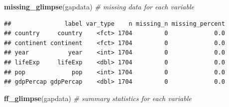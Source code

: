 \documentclass[
  12pt,
  krantz2]{krantz}
\makeatletter
\newenvironment{Shaded}{\begin{snugshade}}{\end{snugshade}}
\newcommand{\CommentTok}[1]{\textcolor[rgb]{0.56,0.35,0.01}{\textit{#1}}}
\newcommand{\KeywordTok}[1]{\textcolor[rgb]{0.13,0.29,0.53}{\textbf{#1}}}
\newcommand{\NormalTok}[1]{#1}
\newenvironment{kframe}{%
\medskip{}
\setlength{\fboxsep}{.8em}
 \def\at@end@of@kframe{}%
 \ifinner\ifhmode%
  \def\at@end@of@kframe{\end{minipage}}%
  \begin{minipage}{\columnwidth}%
 \fi\fi%
 \def\FrameCommand##1{\hskip\@totalleftmargin \hskip-\fboxsep
 \colorbox{shadecolor}{##1}\hskip-\fboxsep
     \hskip-\linewidth \hskip-\@totalleftmargin \hskip\columnwidth}%
 \MakeFramed {\advance\hsize-\width
   \@totalleftmargin\z@ \linewidth\hsize
   \@setminipage}}%
 {\par\unskip\endMakeFramed%
 \at@end@of@kframe}
\renewenvironment{Shaded}{\begin{kframe}}{\end{kframe}}
\makeatother
\begin{document}
\begin{Shaded}
\begin{Highlighting}[]
\KeywordTok{missing_glimpse}\NormalTok{(gapdata) }\CommentTok{# missing data for each variable}
\end{Highlighting}
\end{Shaded}

\begin{verbatim}
##               label var_type    n missing_n missing_percent
## country     country    <fct> 1704         0             0.0
## continent continent    <fct> 1704         0             0.0
## year           year    <int> 1704         0             0.0
## lifeExp     lifeExp    <dbl> 1704         0             0.0
## pop             pop    <int> 1704         0             0.0
## gdpPercap gdpPercap    <dbl> 1704         0             0.0
\end{verbatim}

\begin{Shaded}
\begin{Highlighting}[]
\KeywordTok{ff_glimpse}\NormalTok{(gapdata) }\CommentTok{# summary statistics for each variable}
\end{Highlighting}
\end{Shaded}


\begin{table}[!h]

\caption{\label{tab:unnamed-chunk-5}Gapminder dataset, ff\_glimpse: continuous.}
\centering
{}
\end{table}

\begin{table}[!h]

\caption{\label{tab:unnamed-chunk-6}Gapminder dataset, ff\_glimpse: categorical.}
\centering
{}
\end{table}
\end{document}

